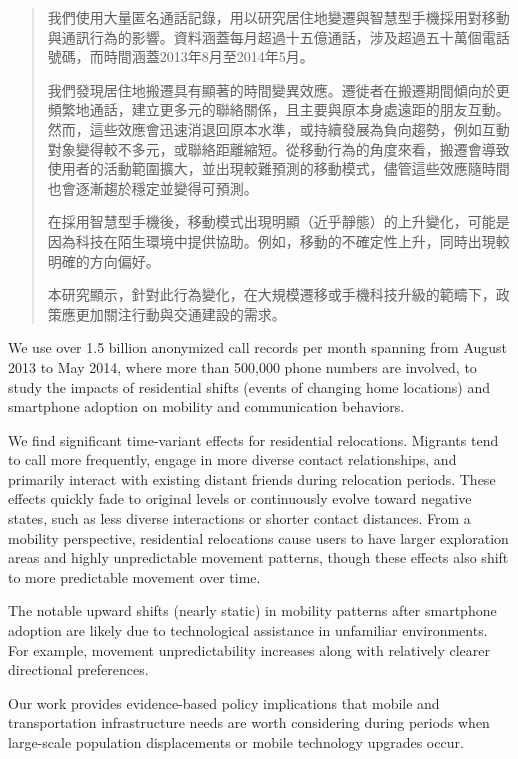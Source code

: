 
\begin{abstract}
我們使用大量匿名通話記錄，用以研究居住地變遷與智慧型手機採用對移動與通訊行為的影響。資料涵蓋每月超過十五億通話，涉及超過五十萬個電話號碼，而時間涵蓋2013年8月至2014年5月。

我們發現居住地搬遷具有顯著的時間變異效應。遷徙者在搬遷期間傾向於更頻繁地通話，建立更多元的聯絡關係，且主要與原本身處遠距的朋友互動。然而，這些效應會迅速消退回原本水準，或持續發展為負向趨勢，例如互動對象變得較不多元，或聯絡距離縮短。從移動行為的角度來看，搬遷會導致使用者的活動範圍擴大，並出現較難預測的移動模式，儘管這些效應隨時間也會逐漸趨於穩定並變得可預測。

在採用智慧型手機後，移動模式出現明顯（近乎靜態）的上升變化，可能是因為科技在陌生環境中提供協助。例如，移動的不確定性上升，同時出現較明確的方向偏好。

本研究顯示，針對此行為變化，在大規模遷移或手機科技升級的範疇下，政策應更加關注行動與交通建設的需求。
\end{abstract}


\begin{abstract*}
We use over 1.5 billion anonymized call records per month spanning from August 2013 to May 2014, where more than 500,000 phone numbers are involved, to study the impacts of residential shifts (events of changing home locations) and smartphone adoption on mobility and communication behaviors.

We find significant time-variant effects for residential relocations. Migrants tend to call more frequently, engage in more diverse contact relationships, and primarily interact with existing distant friends during relocation periods. These effects quickly fade to original levels or continuously evolve toward negative states, such as less diverse interactions or shorter contact distances. From a mobility perspective, residential relocations cause users to have larger exploration areas and highly unpredictable movement patterns, though these effects also shift to more predictable movement over time.

The notable upward shifts (nearly static) in mobility patterns after smartphone adoption are likely due to technological assistance in unfamiliar environments. For example, movement unpredictability increases along with relatively clearer directional preferences.

Our work provides evidence-based policy implications that mobile and transportation infrastructure needs are worth considering during periods when large-scale population displacements or mobile technology upgrades occur.
\end{abstract*}

